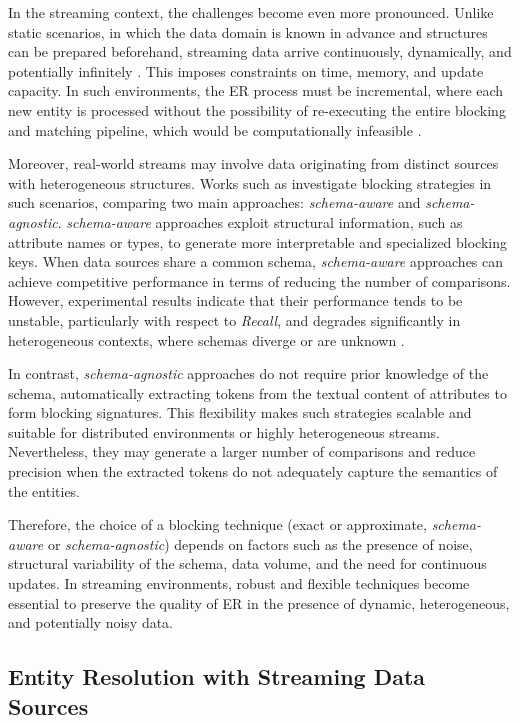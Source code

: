 \documentclass{ieeeaccess}
\begin{document}
In the streaming context, the challenges become even more pronounced. Unlike static scenarios, in which the data domain is known in advance and structures can be prepared beforehand, streaming data arrive continuously, dynamically, and potentially infinitely \cite{araujo2026x}. This imposes constraints on time, memory, and update capacity. In such environments, the ER process must be incremental, where each new entity is processed without the possibility of re-executing the entire blocking and matching pipeline, which would be computationally infeasible \cite{DONASCIMENTO2018335, DBLP:journals/corr/RenC17}.

Moreover, real-world streams may involve data originating from distinct sources with heterogeneous structures. Works such as \cite{10.14778/2856318.2856326, Papadakis2016ScalingER} investigate blocking strategies in such scenarios, comparing two main approaches: \textit{schema-aware} and \textit{schema-agnostic}. \textit{schema-aware} approaches exploit structural information, such as attribute names or types, to generate more interpretable and specialized blocking keys. When data sources share a common schema, \textit{schema-aware} approaches can achieve competitive performance in terms of reducing the number of comparisons. However, experimental results indicate that their performance tends to be unstable, particularly with respect to \textit{Recall}, and degrades significantly in heterogeneous contexts, where schemas diverge or are unknown \cite{10.14778/2856318.2856326}.

In contrast, \textit{schema-agnostic} approaches do not require prior knowledge of the schema, automatically extracting tokens from the textual content of attributes to form blocking signatures. This flexibility makes such strategies scalable and suitable for distributed environments or highly heterogeneous streams. Nevertheless, they may generate a larger number of comparisons and reduce precision when the extracted tokens do not adequately capture the semantics of the entities.

Therefore, the choice of a blocking technique (exact or approximate, \textit{schema-aware} or \textit{schema-agnostic}) depends on factors such as the presence of noise, structural variability of the schema, data volume, and the need for continuous updates. In streaming environments, robust and flexible techniques become essential to preserve the quality of ER in the presence of dynamic, heterogeneous, and potentially noisy data.

\subsection{Entity Resolution with Streaming Data Sources}
\end{document}
